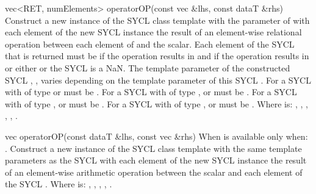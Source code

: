   \addRow
    {vec<RET, numElements> operatorOP(const vec \&lhs, const dataT \&rhs)}
    {
      Construct a new instance of the SYCL  class template with the  parameter of  with each element of the new SYCL  instance the result of an element-wise  relational operation between each element of   and the  scalar. Each element of the SYCL  that is returned must be  if the operation results in  and  if the operation results in  or either   or the  SYCL  is a NaN.
      \newline \newline
      The  template parameter of the constructed SYCL , , varies depending on the  template parameter of this SYCL . For a SYCL  with  of type  or   must be . For a SYCL  with  of type ,  or   must be . For a SYCL  with  of type ,  or   must be . For a SYCL  with  of type ,  or   must be .
      \newline \newline
      Where  is: \codeinline{==}, \codeinline{!=}, \codeinline{<}, \codeinline{>}, \codeinline{<=}, \codeinline{>=}. 
    }

  \addRow
  { vec operatorOP(const dataT \&lhs, const vec \&rhs) }
  {
    When  is \codeinline{\%} available only when: .
    \newline
    Construct a new instance of the SYCL  class template with
    the same template parameters as the  SYCL 
    with each element of the new SYCL  instance the result of
    an element-wise  arithmetic operation between the
     scalar and each element of the  SYCL
    .
    \newline \newline
    Where  is: \codeinline{+}, \codeinline{-}, \codeinline{*},
    \codeinline{/}, \codeinline{\%}.
  }

